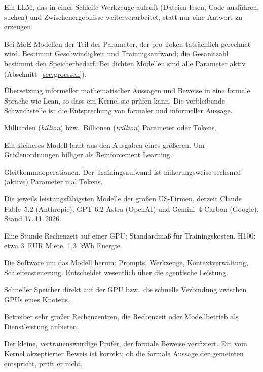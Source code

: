 \documentclass[a4paper,11pt]{article}
\begin{document}
\begin{description}[style=sameline, itemsep=0.15em]
\item[Agent, agentisch] Ein LLM, das in einer Schleife Werkzeuge
  aufruft (Dateien lesen, Code ausführen, suchen) und Zwischenergebnisse
  weiterverarbeitet, statt nur eine Antwort zu erzeugen.
\item[Aktive Parameter] Bei MoE-Modellen der Teil der Parameter, der
  pro Token tatsächlich gerechnet wird. Bestimmt Geschwindigkeit und
  Trainingsaufwand; die Gesamtzahl bestimmt den Speicherbedarf. Bei
  dichten Modellen sind alle Parameter aktiv
  (Abschnitt~\ref{sec:groessen}).
\item[Autoformalisierung] Übersetzung informeller mathematischer
  Aussagen und Beweise in eine formale Sprache wie Lean, so dass ein
  Kernel sie prüfen kann. Die verbleibende Schwachstelle ist die
  Entsprechung von formaler und informeller Aussage.
\item[B, T] Milliarden (\emph{billion}) bzw.\ Billionen
  (\emph{trillion}) Parameter oder Tokens.
\item[Destillation] Ein kleineres Modell lernt aus den Ausgaben eines
  größeren. Um Größenordnungen billiger als Reinforcement Learning.
\item[FLOP, $6NT$] Gleitkommaoperationen. Der Trainingsaufwand ist
  näherungsweise sechsmal (aktive) Parameter mal Tokens.
\item[Frontiermodell] Die jeweils leistungsfähigsten Modelle der
  großen US-Firmen, derzeit Claude Fable~5.2 (Anthropic), GPT-6.2
  Astra (OpenAI) und Gemini~4 Carbon (Google), Stand 17.\,11.\,2026.
\item[GPU-Stunde] Eine Stunde Rechenzeit auf einer GPU; Standardmaß
  für Trainingskosten. H100: etwa 3~EUR Miete, 1,3~kWh Energie.
\item[Harness] Die Software um das Modell herum: Prompts, Werkzeuge,
  Kontextverwaltung, Schleifensteuerung. Entscheidet wesentlich über
  die agentische Leistung.
\item[HBM, NVLink] Schneller Speicher direkt auf der GPU bzw.\ die
  schnelle Verbindung zwischen GPUs eines Knotens.
\item[Hyperscaler] Betreiber sehr großer Rechenzentren, die Rechenzeit
  oder Modellbetrieb als Dienstleistung anbieten.
\item[Kernel (Lean)] Der kleine, vertrauenswürdige Prüfer, der formale
  Beweise verifiziert. Ein vom Kernel akzeptierter Beweis ist korrekt;
  ob die formale Aussage der gemeinten entspricht, prüft er nicht.

\end{description}
\end{document}
